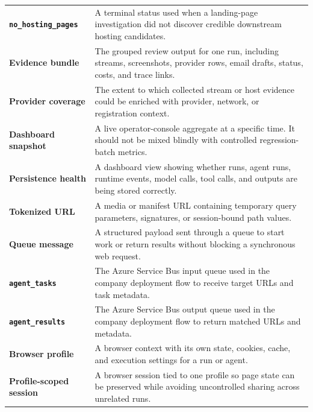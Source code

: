\begin{longtable}{>{\raggedright\arraybackslash\bfseries}p{4.1cm}
                  >{\raggedright\arraybackslash}p{9.7cm}}
\texttt{no\_hosting\_\allowbreak pages} & A terminal status used when a landing-page investigation did not discover credible downstream hosting candidates. \\
Evidence bundle & The grouped review output for one run, including streams, screenshots, provider rows, email drafts, status, costs, and trace links. \\
Provider coverage & The extent to which collected stream or host evidence could be enriched with provider, network, or registration context. \\
Dashboard snapshot & A live operator-console aggregate at a specific time. It should not be mixed blindly with controlled regression-batch metrics. \\
Persistence health & A dashboard view showing whether runs, agent runs, runtime events, model calls, tool calls, and outputs are being stored correctly. \\
Tokenized URL & A media or manifest URL containing temporary query parameters, signatures, or session-bound path values. \\
Queue message & A structured payload sent through a queue to start work or return results without blocking a synchronous web request. \\
\texttt{agent\_tasks} & The Azure Service Bus input queue used in the company deployment flow to receive target URLs and task metadata. \\
\texttt{agent\_results} & The Azure Service Bus output queue used in the company deployment flow to return matched URLs and metadata. \\
Browser profile & A browser context with its own state, cookies, cache, and execution settings for a run or agent. \\
Profile-scoped session & A browser session tied to one profile so page state can be preserved while avoiding uncontrolled sharing across unrelated runs. \\
\bottomrule
\end{longtable}
\clearpage
